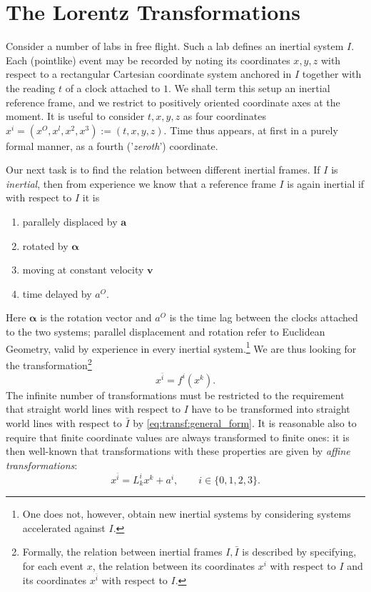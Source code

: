 \section{The Lorentz Transformations}
Consider a number of labs in free flight. Such a lab defines
an inertial system $ I $. Each (pointlike) event may be recorded by noting its coordinates $ x, y, z $ with respect to a rectangular Cartesian coordinate system anchored in $ I $ together with the reading $ t $ of a clock attached to $ 1 $. We shall term this setup an inertial reference frame, and we restrict to positively oriented coordinate axes at the moment.
It is useful to consider $ t,x,y,z $ as four coordinates $ x^i = (x^O,x^l,x^2,x^3):= (t,x,y,z) $.
Time thus appears, at first in a purely formal manner, as a fourth ('\emph{zeroth}') coordinate.

Our next task is to find the relation between different inertial frames. If $ I $ is \emph{inertial}, then from experience we know that a reference frame $ I $ is again inertial if with respect to $ I $ it is 
\begin{enumerate}
	\item parallely displaced by $ \mathbf{a} $
	\item rotated by $ \mathbf{\alpha} $
	\item moving at constant velocity $ \mathbf{v} $
	\item time delayed by $ a^O $.
\end{enumerate}
Here $ \mathbf{\alpha} $ is the rotation vector and $ a^O $ is the time lag between the clocks attached to the two systems; parallel displacement and rotation refer to Euclidean Geometry, valid by experience in every inertial system.\footnote{One does not, however, obtain new inertial systems by considering systems accelerated against $ I $.}
We are thus looking for the transformation\footnote{Formally, the relation between inertial frames $ I, \bar{I} $ is described by specifying, for each event $ x $, the relation between its coordinates $ x^i $ with respect to $ I $ and its coordinates $ x^{\bar{i}} $ with respect to $ I $.}
\begin{equation}
\label{eq:transf:general_form}
x^{\bar{i}}=f^i(x^k).
\end{equation}
The infinite number of transformations must be restricted to the requirement that straight world lines with respect to $ I $ have to be transformed into straight world lines with respect to $ \bar{I} $ by \eqref{eq:transf:general_form}. It is reasonable also to require that finite coordinate values are always transformed to finite ones: it is then well-known that transformations with these properties are given by \emph{affine transformations}:
\begin{equation}
x^{\bar{i}}=L^i_kx^k +a^i, \qquad i\in \{0,1,2,3\}.
\label{eq:transf:general_form2}
\end{equation}
